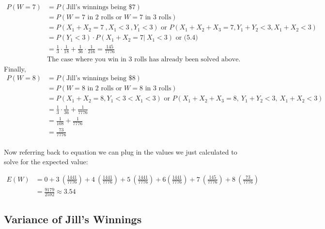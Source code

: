 \documentclass{article}
\numberwithin{equation}{section}
\newcommand{\eqname}[1]{\tag*{#1}}%
\begin{document}
\begin{align} 
	    \label{W=7}
	    P(W=7) &= P(\text{Jill's winnings being \$7})  \eqname{} \\
	    &= P(W=7 \text{ in 2 rolls or } W=7 \text{ in 3 rolls}) \eqname{} \\
	    &= P(X_1+X_2=7\:,X_1<3\:, Y_1 < 3) \text{ or } P(X_1+X_2+X_3 = 7 , Y_1+Y_2<3, X_1+X_2<3)\eqname{} \\
	    &= P(Y_1 < 3) \cdot P(X_1+X_2=7\vert \: X_1 < 3) \text{ or } \text{(5.4)} \eqname{} \\
        &= \frac{1}{3}\cdot \frac{1}{18} + \frac{1}{36}\cdot\frac{1}{216} = \frac{145}{7776} \eqname{} \\
        & \text{The case where you win in 3 rolls has already been solved above.}
\end{align}
Finally,
\begin{align} 
	    \label{W=8}
	    P(W=8) &= P(\text{Jill's winnings being \$8})  \eqname{} \\
	    &= P(W=8 \text{ in 2 rolls or } W=8 \text{ in 3 rolls}) \eqname{} \\
	    &= P(X_1 + X_2 = 8, Y_1 < 3< X_1 < 3) \text{ or } P(X_1+X_2+X_3 = 8 , \: Y_1+Y_2<3,\: X_1+X_2<3) \eqname{} \\
	    &= \frac{1}{3}\cdot \frac{1}{36} + \frac{1}{7776} \eqname{} \\ 
	    &= \frac{1}{108} + \frac{1}{7776} \eqname{} \\
	    &= \frac{73}{7776} \eqname{} \\
\end{align}

Now referring back to equation  we can plug in the values we just calculated to solve for the expected value:

\begin{align} 
	    \label{E(W)}
	    E(W) &= 0+3\:\left( \frac{1441}{7776} \right) +4\:\left(\frac{1441}{7776} \right) + 5\:\left(\frac{1441}{7776}\right) + 6\left( \frac{1441}{7776}\right) + 7\:\left( \frac{145}{7776}\right) + 8\:\left(\frac{73}{7776}\right) \eqname{} \\
	    &= \frac{9179}{2592} \approx 3.54
\end{align}

\pagebreak
\subsection{Variance of Jill's Winnings}
\end{document}
